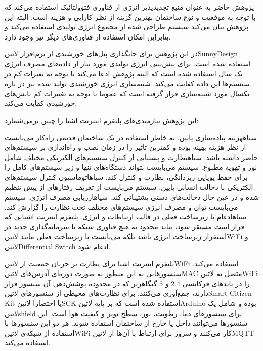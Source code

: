 پژوهش حاضر به عنوان منبع تجدید‌پذیر انرژی از فناوری فتوولتائیک استفاده می‌کند که با توجه به موقعیت و نوع ساختمان بهترین گزینه از نظر کارایی و هزینه است.
البته این پژوهش بیان می‌کند سیستم طراحی شده از مجموع انرژی تولیدی استفاده می‌کند و بنابراین امکان استفاده از فناوری‌های دیگر نیز وجود دارد.

در این پژوهش برای جایگذاری پنل‌های خورشیدی از نرم‌افزار ‌لاتین{SunnyDesign} استفاده شده است. برای پیش‌بینی انرژی تولیدی مورد نیاز از داده‌های مصرف
انرژی یک سال استفاده شده است که البته پژوهش ادعا می‌کند با توجه به تغیرات کم در سیستم‌ها این داده کفایت می‌کند. شبیه‌سازی انرژی خورشیدی تولید شده نیز
در بازه یکسال مورد شبیه‌سازی قرار گرفته است که عموما با توجه به تغییرات کم تابش‌های خورشیدی کفایت می‌کند.

این پژوهش نیازمندی‌های پلتفرم اینترنت اشیا را چنین برمی‌شمارد:

 ‌سیاه{هزینه پیاده‌سازی پایین}. به خاطر استفاده در یک ساختمان قدیمی راه‌کار می‌بایست از نظر هزینه بهینه بوده و کمترین تاثیر را در زمان نصب و راه‌اندازی
بر سیستم‌های حاضر داشته باشد.
 ‌سیاه{نظارت و پشتیانی از کنترل سیستم‌های الکتریکی مختلف شامل نور و تهویه مطبوع}. سیستم می‌بایست بتواند دستگاه‌های تنها
و زیر سیستم‌های کامل را برای حفظ پویایی ریزدانگی، نظارت و کنترل کند.
 ‌سیاه{اتوماسیون کنترل سیستم‌های الکتریکی با دخالت انسانی پایین}. سیستم می‌بایست از تعریف رفتارهای از پیش تنظیم شده و در عین حال دخالت‌های دستی
پشتیبانی کند.
 ‌سیاه{ارزیابی مصرف انرژی}. سیستم می‌بایست توان و مصرف انرژی سیستم‌های مختلف تحت نظارت را گزارش کند.
 ‌سیاه{ادغام با زیرساخت فعلی در قالب ارتباطات و انرژی}. پلتفرم اینترنت اشیایی که قرار است مستقر شود، نباید محدود به هیچ فناوری شبکه یا سرمایه‌گذاری
جدید در استقرار زیرساخت انرژی باشد بلکه می‌بایست با زیرساخت فعلی مانند ‌لاتین{WiFi} و ‌لاتین{Differential Switch} ادغام شود.

پلتفرم اینترنت اشیا برای نظارت بر جریان جمعیت از ‌لاتین{WiFi} استفاده می‌کند. سنسورهایی به این منظور به صورت دوره‌ای آدرس‌های ‌لاتین{MAC} متصل به
‌لاتین{WiFi} را در باندهای فرکانسی $2.4$ و $5$ گیگاهرتز که در محدوده پوشش‌دهی آن سنسور قرار دارند، جمع‌آوری می‌کنند.
برای نظارت‌های محیطی از سنسورهای ‌لاتین{Smart Citizen Kit} یا اختصارا ‌لاتین{SCK} استفاده شده است که بر پایه ‌لاتین{Arduino} بوده
و شامل یک ‌لاتین{shield} برای سنسورهای دما، رطوبت، نور، سطح نویز و کیفیت هوا است. این سنسورها می‌توانند داخل یا خارج از ساختمان استفاده شوند.
هر دو این سنسورها با استفاده از شبکه‌ی ‌لاتین{WiFi} کار می‌کنند و سرور برای ارتباط با آن‌ها از ‌لاتین{MQTT} استفاده می‌کند.

